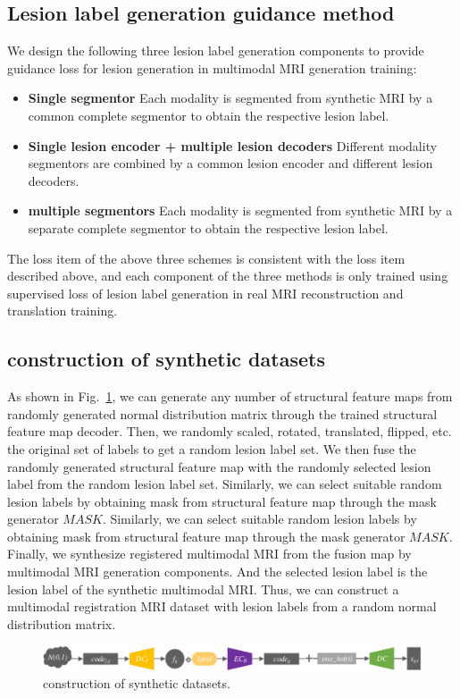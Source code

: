 \documentclass[letterpaper]{article} %
\begin{document}
\subsection{Lesion label generation guidance method}
\label{label gen methods}
We design the following three lesion label generation components to provide guidance loss for lesion generation in multimodal MRI generation training:
\begin{itemize}
	\item \textbf{Single segmentor} 
	Each modality is segmented from synthetic MRI by a common complete segmentor to obtain the respective lesion label.
	\item \textbf{Single lesion encoder + multiple lesion decoders} 
	Different modality segmentors are combined by a common lesion encoder and different lesion decoders. 
	\item \textbf{multiple segmentors} 
	Each modality is segmented from synthetic MRI by a separate complete segmentor to obtain the respective lesion label.
\end{itemize}
The loss item of the above three schemes is consistent with the loss item described above, and each component of the three methods is only trained using supervised loss of lesion label generation in real MRI reconstruction and translation training.

\subsection{construction of synthetic datasets}
\label{make dataset}
As shown in Fig.~\ref{make_data}, we can generate any number of structural feature maps from randomly generated normal distribution matrix through the trained structural feature map decoder. Then, we randomly scaled, rotated, translated, flipped, etc. the original set of labels to get a random lesion label set. We then fuse the randomly generated structural feature map with the randomly selected lesion label from the random lesion label set. Similarly, we can select suitable random lesion labels by obtaining mask from structural feature map through the mask generator $MASK$. Similarly, we can select suitable random lesion labels by obtaining mask from structural feature map through the mask generator $MASK$. Finally, we synthesize registered multimodal MRI from the fusion map by multimodal MRI generation components. And the selected lesion label is the lesion label of the synthetic multimodal MRI. Thus, we can construct a multimodal registration MRI dataset with lesion labels from a random normal distribution matrix.
\begin{figure}
	\centering
	\includegraphics[width=0.98\columnwidth]{figures/make_data}
	\caption{construction of synthetic datasets.}
	\label{make_data}
\end{figure}
\end{document}

